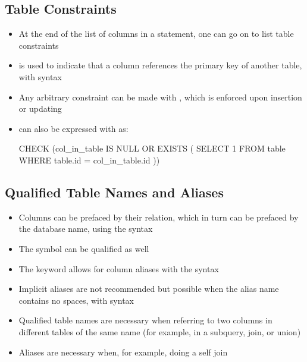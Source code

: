 \documentclass[a4paper]{article}
\begin{document}
\subsection{Table Constraints}
\begin{itemize}
    \item At the end of the list of columns in a  statement, one can go on to list table constraints
    \item {} is used to indicate that a column references the primary key of another table, with syntax 
    \item Any arbitrary constraint can be made with , which is enforced upon insertion or updating
    \item {} can also be expressed with  as:
\begin{sql}
CHECK (col_in_table IS NULL OR EXISTS (
    SELECT 1 FROM table
    WHERE table.id = col_in_table.id
))
\end{sql}
\end{itemize}

\subsection{Qualified Table Names and Aliases}
\begin{itemize}
    \item Columns can be prefaced by their relation, which in turn can be prefaced by the database name, using the syntax 
    \item The \ilsql{*} symbol can be qualified as well
    \item The  keyword allows for column aliases with the syntax 
    \item Implicit aliases are not recommended but possible when the alias name contains no spaces, with syntax 
    \item Qualified table names are necessary when referring to two columns in different tables of the same name (for example, in a subquery, join, or union)
    \item Aliases are necessary when, for example, doing a self join
\end{itemize}
\end{document}
